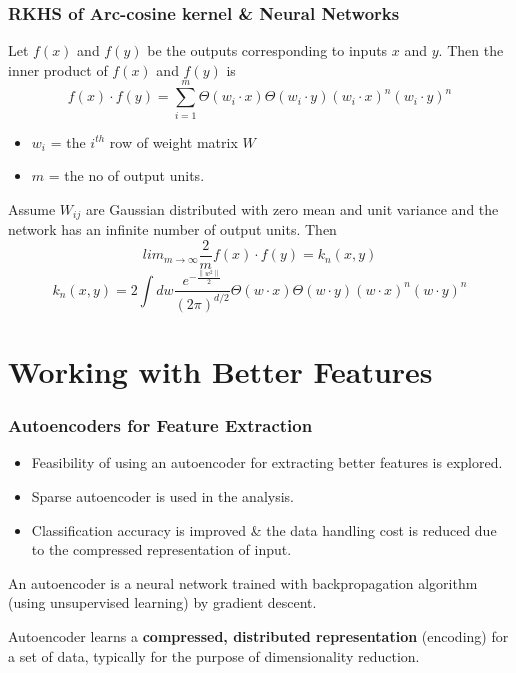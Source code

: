 \documentclass{beamer}
\begin{document}
\begin{frame}
\frametitle{RKHS of Arc-cosine kernel \& Neural Networks}
Let $f(x)$ and $f(y)$ be the outputs corresponding to inputs $x$ and $y$. Then the inner product of $f(x)$ and $f(y)$ is
\[ f(x)\cdot f(y) = \sum_{i=1}^m \Theta(w_i\cdot x) \Theta(w_i\cdot y)(w_i\cdot x)^n (w_i\cdot y)^n\]
\begin{itemize}
\item $w_i$ = the $i^{th}$ row of weight matrix $W$ 
\item  $m$ = the no of output units.
\end{itemize}
Assume $W_{ij}$ are Gaussian distributed with zero mean and unit variance and the network has an infinite number of output units. Then
\[ lim_{m\rightarrow \infty} \frac{2}{m}f(x)\cdot f(y) = k_n(x,y) \]
\[ k_n(x,y) = 2\int dw \frac{e^{-\frac{\left \| w^2 \right \|}{2}}}{(2\pi )^{d/2}} \Theta (w\cdot x) \Theta (w\cdot y) (w\cdot x)^n (w\cdot y)^n\]
\end{frame}


\section{Working with Better Features}

\begin{frame}
\frametitle{Autoencoders for Feature Extraction}

\begin{itemize}
\item Feasibility of using an autoencoder for extracting better features is explored.
\item Sparse autoencoder is used in the analysis.
\item Classification accuracy is improved \& the data handling cost is reduced due to the compressed representation of input. 
\end{itemize}
An autoencoder is a neural network trained with backpropagation algorithm (using unsupervised learning) by gradient descent.\\

\begin{block}{}
Autoencoder learns a \textbf{compressed, distributed representation} (encoding) for a set of data, typically for the purpose of dimensionality reduction.
\end{block}
\end{frame}
\end{document}
